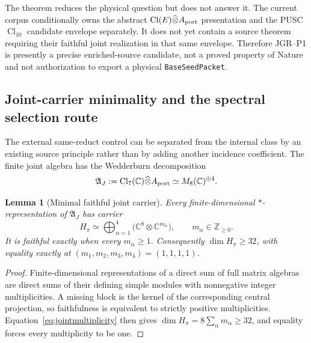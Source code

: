 \documentclass[11pt,a4paper]{article}
\newtheorem{lemma}[definition]{Lemma}
\theoremstyle{remark}
\begin{document}
The theorem reduces the physical question but does not answer it.  The
current corpus conditionally owns the abstract
$\operatorname{Cl}(E)\widehat\otimes A_{\rm port}$ presentation and the
PUSC $\operatorname{Cl}_{10}$ candidate envelope separately.  It does not
yet contain a source theorem requiring their faithful joint realization in
that same envelope.  Therefore JGR--P1 is presently a precise enriched-source
candidate, not a proved property of Nature and not authorization to export a
physical \texttt{BaseSeedPacket}.

\subsection{Joint-carrier minimality and the spectral selection route}

The external same-reduct control can be separated from the internal class by
an existing source principle rather than by adding another incidence
coefficient.  The finite joint algebra has the Wedderburn decomposition
\begin{equation}
 \mathfrak A_J
 :=\operatorname{Cl}_7(\mathbb C)\widehat\otimes A_{\rm port}
 \simeq M_8(\mathbb C)^{\oplus4}.
 \label{eq:jointwedderburn}
\end{equation}

\begin{lemma}[Minimal faithful joint carrier]
Every finite-dimensional $*$-representation of $\mathfrak A_J$ has carrier
\begin{equation}
 H_\pi\simeq
 \bigoplus_{\alpha=1}^{4}
 \bigl(\mathbb C^8\otimes\mathbb C^{m_\alpha}\bigr),
 \qquad m_\alpha\in\mathbb Z_{\ge0}.
 \label{eq:jointmultiplicity}
\end{equation}
It is faithful exactly when every $m_\alpha\ge1$.  Consequently
$\dim H_\pi\ge32$, with equality exactly at
$(m_1,m_2,m_3,m_4)=(1,1,1,1)$.
\label{lem:minjointcarrier}
\end{lemma}

\begin{proof}
Finite-dimensional representations of a direct sum of full matrix algebras
are direct sums of their defining simple modules with nonnegative integer
multiplicities.  A missing block is the kernel of the corresponding central
projection, so faithfulness is equivalent to strictly positive
multiplicities.  Equation~\eqref{eq:jointmultiplicity} then gives
$\dim H_\pi=8\sum_\alpha m_\alpha\ge32$, and equality forces every
multiplicity to be one.
\end{proof}
\end{document}
